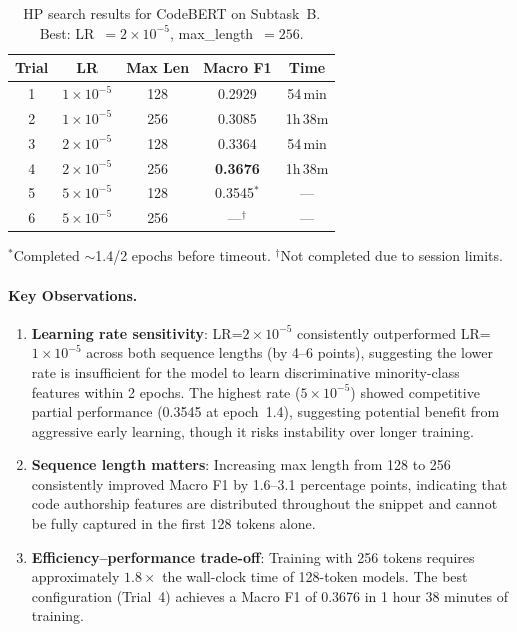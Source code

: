 \documentclass[11pt]{article}
\begin{document}
\begin{table}[htbp]
\centering
\footnotesize
\begin{tabularx}{\columnwidth}{@{}c c c c c@{}}
\toprule
\textbf{Trial} & \textbf{LR} & \textbf{Max Len} & \textbf{Macro F1} & \textbf{Time} \\ \midrule
1 & $1{\times}10^{-5}$ & 128 & 0.2929 & 54\,min \\
2 & $1{\times}10^{-5}$ & 256 & 0.3085 & 1h\,38m \\
3 & $2{\times}10^{-5}$ & 128 & 0.3364 & 54\,min \\
4 & $2{\times}10^{-5}$ & 256 & \textbf{0.3676} & 1h\,38m \\
5 & $5{\times}10^{-5}$ & 128 & 0.3545$^*$ & --- \\
6 & $5{\times}10^{-5}$ & 256 & ---$^\dagger$ & --- \\
\bottomrule
\end{tabularx}
\begin{minipage}{\columnwidth}
\scriptsize
$^*$Completed $\sim$1.4/2 epochs before timeout.
$^\dagger$Not completed due to session limits.
\end{minipage}
\caption{HP search results for CodeBERT on Subtask~B. Best: LR~$= 2{\times}10^{-5}$, max\_length~$= 256$.}
\label{tab:taskB_hp_results}
\end{table}

\paragraph{Key Observations.}
\begin{enumerate}
    \item \textbf{Learning rate sensitivity}: LR=$2{\times}10^{-5}$ consistently outperformed LR=$1{\times}10^{-5}$ across both sequence lengths (by 4--6 points), suggesting the lower rate is insufficient for the model to learn discriminative minority-class features within 2 epochs. The highest rate ($5{\times}10^{-5}$) showed competitive partial performance (0.3545 at epoch~1.4), suggesting potential benefit from aggressive early learning, though it risks instability over longer training.
    \item \textbf{Sequence length matters}: Increasing max length from 128 to 256 consistently improved Macro F1 by 1.6--3.1 percentage points, indicating that code authorship features are distributed throughout the snippet and cannot be fully captured in the first 128 tokens alone.
    \item \textbf{Efficiency--performance trade-off}: Training with 256 tokens requires approximately $1.8\times$ the wall-clock time of 128-token models. The best configuration (Trial~4) achieves a Macro F1 of 0.3676 in 1 hour 38 minutes of training.
\end{enumerate}
\end{document}
